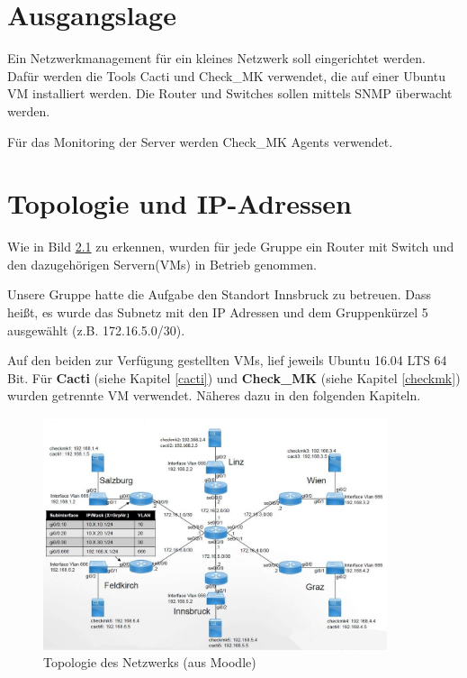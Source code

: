 \thispagestyle{standard}
\pagestyle{standard}
\chapter{Ausgangslage}
\label{ausgangs}

Ein Netzwerkmanagement für ein kleines Netzwerk soll eingerichtet werden. Dafür werden die Tools Cacti und Check\_MK verwendet, die auf einer Ubuntu \ac{VM} installiert werden. 
Die Router und Switches sollen mittels \ac{SNMP} überwacht werden. 

Für das Monitoring der Server werden Check\_MK Agents verwendet.


\chapter{Topologie und IP-Adressen}
\label{topo}


Wie in Bild \ref{img:topologie} zu erkennen, wurden für jede Gruppe ein Router mit Switch und den dazugehörigen Servern(\ac{VM}s) in Betrieb genommen.

Unsere Gruppe hatte die Aufgabe den Standort Innsbruck zu betreuen. Dass hei{\ss}t, es wurde das Subnetz mit den \ac{IP} Adressen und dem Gruppenkürzel 5 ausgewählt (z.B. 172.16.5.0/30).


Auf den beiden zur Verfügung gestellten \ac{VM}s, lief jeweils Ubuntu 16.04 LTS 64 Bit. Für \textbf{Cacti} (siehe Kapitel \ref{cacti}) und \textbf{Check\_MK} (siehe Kapitel \ref{checkmk}) wurden getrennte \ac{VM} verwendet. Näheres dazu in den folgenden Kapiteln.


\begin{figure}[H]
	\centering
	\includegraphics[width=0.9\textwidth]{img/Topologie.JPG}
	\caption{Topologie des Netzwerks (aus Moodle)}
	\label{img:topologie}
\end{figure}

